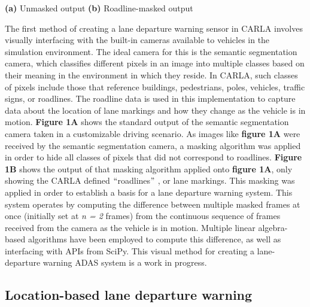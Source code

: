 \documentclass[12pt]{article}
\renewcommand{\_}{\kern-1.5pt\textunderscore\kern-1.5pt}
\begin{document}
\hspace{2cm} \textbf{(a) } Unmasked output \hspace{2.75cm} \textbf{(b) }Roadline-masked output \par
\vspace{\baselineskip}
The first method of creating a lane departure warning sensor in CARLA involves visually interfacing with the built-in cameras available to vehicles in the simulation environment. The ideal camera for this is the semantic segmentation camera, which classifies different pixels in an image into multiple classes based on their meaning in the environment in which they reside. In CARLA, such classes of pixels include those that reference buildings, pedestrians, poles, vehicles, traffic signs, or roadlines. The roadline data is used in this implementation to capture data about the location of lane markings and how they change as the vehicle is in motion.\textbf{ Figure 1A} shows the standard output of the semantic segmentation camera taken in a customizable driving scenario. As images like \textbf{figure 1A }were received by the semantic segmentation camera, a masking algorithm was applied in order to hide all classes of pixels that did not correspond to roadlines. \textbf{Figure 1B }shows the output of that masking algorithm applied onto \textbf{figure 1A}, only showing the CARLA defined $``$roadlines$"$ , or lane markings. This masking was applied in order to establish a basis for a lane departure warning system. This system operates by computing the difference between multiple masked frames at once (initially set at \textit{n = 2} frames) from the continuous sequence of frames received from the camera as the vehicle is in motion. Multiple linear algebra-based algorithms have been employed to compute this difference, as well as interfacing with APIs from SciPy. This visual method for creating a lane-departure warning ADAS system is a work in progress.\par

\subsection{Location-based lane departure warning}

\end{document}
